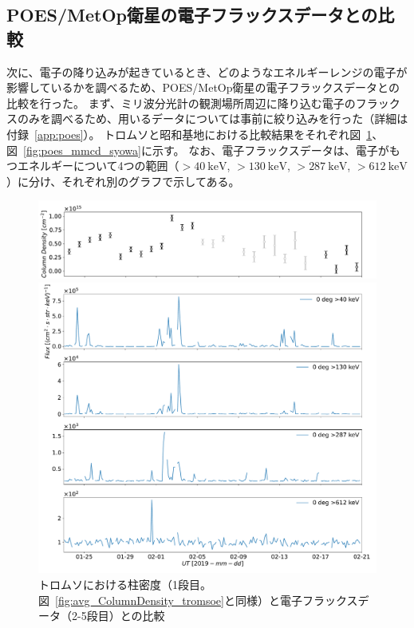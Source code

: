 \subsection{POES/MetOp衛星の電子フラックスデータとの比較}
\label{ssec:comparison_poes}
次に、電子の降り込みが起きているとき、どのようなエネルギーレンジの電子が影響しているかを調べるため、POES/MetOp衛星の電子フラックスデータとの比較を行った。
まず、ミリ波分光計の観測場所周辺に降り込む電子のフラックスのみを調べるため、用いるデータについては事前に絞り込みを行った（詳細は付録~\ref{app:poes}）。
トロムソと昭和基地における比較結果をそれぞれ図~\ref{fig:poes_mmcd_tromsoe}、図~\ref{fig:poes_mmcd_syowa}に示す。
なお、電子フラックスデータは、電子がもつエネルギーについて4つの範囲（$>40\ \mathrm{keV}$, $>130\ \mathrm{keV}$, $>287\ \mathrm{keV}$, $>612\ \mathrm{keV}$）に分け、それぞれ別のグラフで示してある。
\begin{figure}[htbp]
    \centering
    \begin{minipage}{\linewidth}
        \centering
        \includegraphics[width=\linewidth]{master_thesis_contents/master_thesis_fig/avg_ColumnDensity_tromsoe_trim.pdf}
    \end{minipage}
    \begin{minipage}{\linewidth}
        \centering
        \includegraphics[width=\linewidth]{master_thesis_contents/master_thesis_fig/poes_tromsoe_0deg.pdf}
    \end{minipage}
    \caption{トロムソにおける柱密度（1段目。図~\ref{fig:avg_ColumnDensity_tromsoe}と同様）と電子フラックスデータ（2-5段目）との比較}
    \label{fig:poes_mmcd_tromsoe}
\end{figure}

